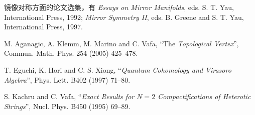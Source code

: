 \begin{reflist}
  \item[{[1]}] 镜像对称方面的论文选集，有
    \textit{Essays on Mirror Manifolds}, eds. S. T. Yau, International Press, 1992;
    \textit{Mirror Symmetry II}, eds. B. Greene and S. T. Yau, International Press, 1997.
  \item[{[2]}] M. Aganagic, A. Klemm, M. Marino and C. Vafa, ``The
\textit{Topological Vertex}'', Commun. Math. Phys. 254 (2005) 425--478.
  \item[{[3]}] T. Eguchi, K. Hori and C. S. Xiong, ``\textit{Quantum Cohomology
    and Virasoro Algebra}'', Phys. Lett. B402 (1997) 71--80.
  \item[{[4]}] S. Kachru and C. Vafa, ``\textit{Exact Results for $N=2$ Compactifications
    of Heterotic Strings}'', Nucl. Phys. B450 (1995) 69--89.
\end{reflist}

